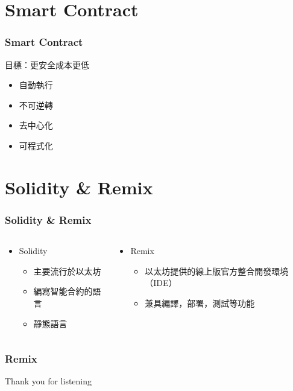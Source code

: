 \documentclass[xcolor=dvipsnames]{beamer}
\begin{document}
\section{Smart Contract}
    
\begin{frame}
\frametitle{Smart Contract}
目標：更安全成本更低
    \pause
\begin{itemize}
        \item 自動執行
    \pause
        \item 不可逆轉
    \pause
        \item 去中心化
    \pause
        \item 可程式化
\end{itemize}
\end{frame}

\section{Solidity \& Remix}

\begin{frame}
\frametitle{Solidity \& Remix}
\begin{columns}
    \begin{column}{0.5\textwidth} %
\begin{block}{
\begin{itemize}
    \item Solidity
    \pause
    \begin{itemize}
        \item 主要流行於以太坊
        \item 編寫智能合約的語言
        \item 靜態語言
    \end{itemize}
\end{itemize}}
\end{block}
    \end{column}
    \begin{column}{0.5\textwidth} %
\begin{block}{
\begin{itemize}
    \item Remix
    \pause
    \begin{itemize}
        \item 以太坊提供的線上版官方整合開發環境（IDE）
        \item 兼具編譯，部署，測試等功能
    \end{itemize}
\end{itemize}}
\end{block}
    \end{column}
\end{columns}
\end{frame}
\begin{frame}
\frametitle{Remix}
\begin{figure}
    \end{figure}
\end{frame}
\begin{frame}[plain] %
	\begin{center}
		{\Huge Thank you for listening}
	\end{center}
\end{frame}
\end{document}
